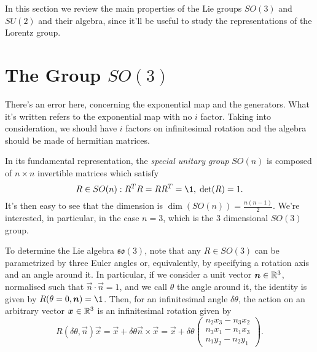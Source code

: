 \color{blue}
In this section we review the main properties of the Lie groups $SO(3)$ and $SU(2)$ and their algebra, since it'll be useful to study the representations of the Lorentz group.

\section{The Group \texorpdfstring{$SO(3)$}{SO(3)}}
\color{red} There's an error here, concerning the exponential map and the generators. What it's written refers to the exponential map with no $i$ factor. Taking into consideration, we should have $i$ factors on infinitesimal rotation and the algebra should be made of hermitian matrices. \color{blue}

In its fundamental representation, the \emph{special unitary group} $SO(n)$ is composed of $n \times n$ invertible matrices which satisfy
\begin{equation}\label{eq:so3-def}
    R \in SO(n) : R^T R = R R^T = \1, \; \det(R) = 1 .
\end{equation}
It's then easy to see that the dimension is $\dim(SO(n)) = \frac{n(n-1)}{2}$. We're interested, in particular, in the case $n=3$, which is the $3$ dimensional $SO(3)$ group.

To determine the Lie algebra $\mathfrak{so}(3)$, note that any $R \in SO(3)$ can be parametrized by three Euler angles or, equivalently, by specifying a rotation axis and an angle around it. In particular, if we consider a unit vector $\boldsymbol{n} \in \mathbb{R}^3$, normalised such that $\vec{n} \cdot \vec{n} = 1$, and we call $\theta$ the angle around it, the identity is given by $R(\theta = 0, \vec{n}) = \1$. Then, for an infinitesimal angle $\delta \theta$, the action on an arbitrary vector $\boldsymbol{x} \in \mathbb{R}^3$ is an infinitesimal rotation given by
\begin{equation}
    R(\delta \theta, \vec{n}) \vec{x} = \vec{x} + \delta \theta \vec{n} \times \vec{x} = \vec{x} + \delta \theta 
    \begin{pmatrix}
        n_2 x_3 - n_3 x_2 \\
        n_3 x_1 - n_1 x_3 \\
        n_1 y_2 - n_2 y_1
    \end{pmatrix}.
\end{equation}

